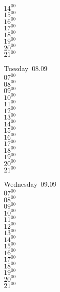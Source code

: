 \documentclass[11pt,a4paper]{book}\usepackage[]{graphicx}\usepackage[]{color}
\begin{document}
{{{{{{{{{\begin{tcolorbox}
{$14^{00}$\\
$15^{00}$\\
$16^{00}$\\
$17^{00}$\\
$18^{00}$\\
$19^{00}$\\
$20^{00}$\\
$21^{00}$}\\
\end{tcolorbox}
%
\begin{tcolorbox}
Tuesday~08.09\\
{ 
$07^{00}$\\
$08^{00}$\\
$09^{00}$\\
$10^{00}$\\
$11^{00}$\\
$12^{00}$\\
$13^{00}$\\
$14^{00}$\\
$15^{00}$\\
$16^{00}$\\
$17^{00}$\\
$18^{00}$\\
$19^{00}$\\
$20^{00}$\\
$21^{00}$}\\
\end{tcolorbox}
%
\begin{tcolorbox}
Wednesday~09.09\\
{ 
$07^{00}$\\
$08^{00}$\\
$09^{00}$\\
$10^{00}$\\
$11^{00}$\\
$12^{00}$\\
$13^{00}$\\
$14^{00}$\\
$15^{00}$\\
$16^{00}$\\
$17^{00}$\\
$18^{00}$\\
$19^{00}$\\
$20^{00}$\\
$21^{00}$}\\
\end{tcolorbox}
\clearpage
%
}}}}}}}}}
\end{document}

